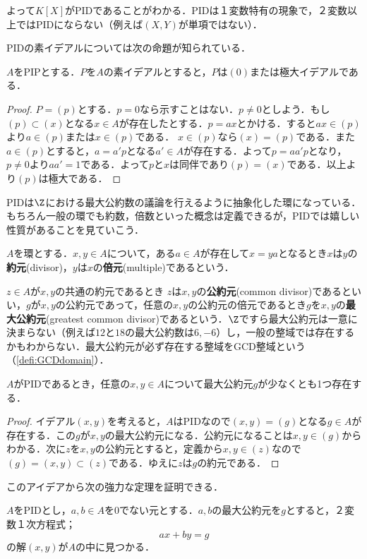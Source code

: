 よって$K[X]$がPIDであることがわかる．PIDは１変数特有の現象で，２変数以上ではPIDにならない（例えば$(X,Y)$が単項ではない）．

PIDの素イデアルについては次の命題が知られている．
\begin{prop}
	$A$をPIPとする．$P$を$A$の素イデアルとすると，$P$は$(0)$または極大イデアルである．
\end{prop}
\begin{proof}
	$P=(p)$とする．$p=0$なら示すことはない．$p\neq0$としよう．もし$(p)\subset (x)$となる$x\in A$が存在したとする．$p=ax$とかける．すると$ax\in (p)$より$a\in (p)$または$x\in (p)$である． $x\in (p)$なら$(x)=(p)$である．また$a\in (p)$とすると，$a=a'p$となる$a'\in A$が存在する．よって$p=aa'p$となり，$p\neq0$より$aa'=1$である．よって$p$と$x$は同伴であり$(p)=(x)$である．以上より$(p)$は極大である．
\end{proof}

PIDは$\Z$における最大公約数の議論を行えるように抽象化した環になっている．もちろん一般の環でも約数，倍数といった概念は定義できるが，PIDでは嬉しい性質があることを見ていこう．

\begin{defi}[約元，倍元]
	$A$を環とする．$x,y\in A$について，ある$a\in A$が存在して$x=ya$となるとき$x$は$y$の\textbf{約元}(divisor)，$y$は$x$の\textbf{倍元}(multiple)であるという．
\end{defi}

$z\in A$が$x,y$の共通の約元であるとき $z$は$x,y$の\textbf{公約元}(common divisor)であるといい，$g$が$x,y$の公約元であって，任意の$x,y$の公約元の倍元であるとき$g$を$x,y$の\textbf{最大公約元}(greatest common divisor)であるという．$\Z$ですら最大公約元は一意に決まらない（例えば$12$と$18$の最大公約数は$6,-6$）し，一般の整域では存在するかもわからない．最大公約元が必ず存在する整域をGCD整域という（\ref{defi:GCDdomain}）．

\begin{prop}
	$A$がPIDであるとき，任意の$x,y\in A$について最大公約元$g$が少なくとも1つ存在する．
\end{prop}

\begin{proof}
	イデアル$(x,y)$を考えると，$A$はPIDなので$(x,y)=(g)$となる$g\in A$が存在する．この$g$が$x,y$の最大公約元になる．公約元になることは$x,y\in(g)$からわかる．次に$z$を$x,y$の公約元とすると，定義から$x,y\in (z)$なので$(g)=(x,y)\subset (z)$である．ゆえに$z$は$g$の約元である．
\end{proof}

このアイデアから次の強力な定理を証明できる．
\begin{thm}
	$A$をPIDとし，$a,b\in A$を0でない元とする．$a,b$の最大公約元を$g$とすると，２変数１次方程式；
	\[ax+by=g\]
	の解$(x,y)$が$A$の中に見つかる．
\end{thm}

